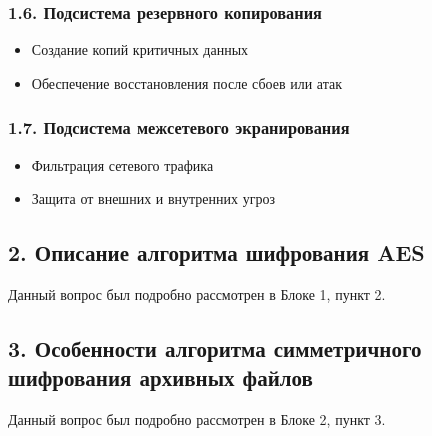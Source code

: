 \subsubsection*{1.6. Подсистема резервного копирования}
\begin{itemize}
    \item Создание копий критичных данных
    \item Обеспечение восстановления после сбоев или атак
\end{itemize}

\subsubsection*{1.7. Подсистема межсетевого экранирования}
\begin{itemize}
    \item Фильтрация сетевого трафика
    \item Защита от внешних и внутренних угроз
\end{itemize}

\subsection*{2. Описание алгоритма шифрования AES}

Данный вопрос был подробно рассмотрен в Блоке 1, пункт 2.

\subsection*{3. Особенности алгоритма симметричного шифрования архивных файлов}

Данный вопрос был подробно рассмотрен в Блоке 2, пункт 3.